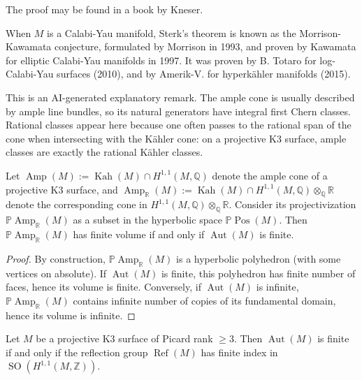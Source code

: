 \noindent
The proof may be found in a book by Kneser.

\medskip\noindent
When $M$ is a Calabi-Yau manifold, Sterk's
theorem is known as the Morrison-Kawamata
conjecture, formulated by Morrison in 1993,
and proven by Kawamata for elliptic Calabi-Yau
manifolds in 1997. It was proven by B. Totaro
for log-Calabi-Yau surfaces (2010), and by
Amerik-V. for hyperkähler manifolds (2015).

\begin{remark}
This is an AI-generated explanatory remark.
The ample cone is usually described by ample line
bundles, so its natural generators have integral
first Chern classes. Rational classes appear here
because one often passes to the rational span of
the cone when intersecting with the Kähler cone:
on a projective K3 surface, ample classes are
exactly the rational Kähler classes.
\end{remark}

\begin{lemma}
Let $\operatorname{Amp}(M):=\operatorname{Kah}(M)\cap H^{1,1}(M,\mathbb{Q})$
denote the ample cone of a projective K3
surface, and $\operatorname{Amp}_{\mathbb{R}}(M):=
\operatorname{Kah}(M)\cap H^{1,1}(M,\mathbb{Q})\otimes_{\mathbb{Q}}\mathbb{R}$
denote the corresponding cone in
$H^{1,1}(M,\mathbb{Q})\otimes_{\mathbb{Q}}\mathbb{R}$.
Consider its projectivization
$\mathbb{P}\operatorname{Amp}_{\mathbb{R}}(M)$ as a
subset in the hyperbolic space $\mathbb{P}\operatorname{Pos}(M)$.
Then $\mathbb{P}\operatorname{Amp}_{\mathbb{R}}(M)$
has finite volume if and only if
$\operatorname{Aut}(M)$ is finite.
\end{lemma}

\begin{proof}
By construction,
$\mathbb{P}\operatorname{Amp}_{\mathbb{R}}(M)$ is a
hyperbolic polyhedron (with some vertices on
absolute). If $\operatorname{Aut}(M)$ is finite, this
polyhedron has finite number of faces, hence its
volume is finite. Conversely, if $\operatorname{Aut}(M)$
is infinite, $\mathbb{P}\operatorname{Amp}_{\mathbb{R}}(M)$
contains infinite number of copies of its fundamental
domain, hence its volume is infinite.
\end{proof}

\begin{theorem}[Vinberg]
Let $M$ be a projective K3 surface of
Picard rank $\geq 3$. Then $\operatorname{Aut}(M)$
is finite if and only if the reflection group
$\operatorname{Ref}(M)$ has finite index in
$\operatorname{SO}(H^{1,1}(M,\mathbb{Z}))$.
\end{theorem}

